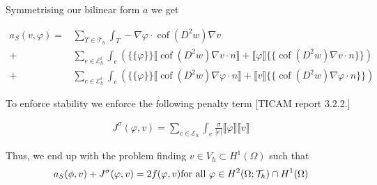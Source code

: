 \documentclass[a4paper,11pt]{article}
\newcommand{\myint}{\displaystyle\int}
\newcommand{\cof}{\operatorname{cof}}
\newcommand{\edges}{\mathcal{E}_h}
\newcommand{\edgesi}{\mathcal{E}_h^i}
\newcommand{\edgesb}{\mathcal{E}_h^b}
\newcommand{\triang}{\mathcal{T}_h}
\begin{document}
Symmetrising our bilinear form $a$ we get

\begin{eqnarray*}
 a_S(v, \varphi) = &\sum\limits_{T \in \triang} \myint_T -\nabla \varphi \cdot \cof(D^2 w) \nabla v \\
 + &\sum\limits_{e \in \edgesi}\myint_{e} \left( \{\{\varphi\}\} \llbracket \cof(D^2 w) \nabla v \cdot n \rrbracket + \llbracket\varphi\rrbracket \{\{ \cof(D^2 w) \nabla v \cdot n \}\} \right)  \\
 +& \sum\limits_{e \in \edgesi}\myint_{e} \left( \{\{\varphi\}\} \llbracket \cof(D^2 w) \nabla \varphi \cdot n \rrbracket + \llbracket v\rrbracket \{\{ \cof(D^2 w) \nabla \varphi \cdot n \}\} \right) 
\end{eqnarray*}

To enforce stability we enforce the following penalty term [TICAM report 3.2.2.]

\begin{eqnarray*}
	J^\sigma(\varphi, v) = \sum\limits_{e \in \edges} \myint_e \frac \sigma {|e|} \llbracket \varphi \rrbracket \llbracket v \rrbracket
\end{eqnarray*}

Thus, we end up with the problem finding $v \in V_h \subset H^1(\Omega)$ such that
\[
	a_S(\phi,v) + J^\sigma(\varphi,v) = 2f(\varphi, v) \textnormal{for all } \varphi \in H^2(\Omega; \triang) \cap H^1(\Omega) 
\] 
\end{document}
